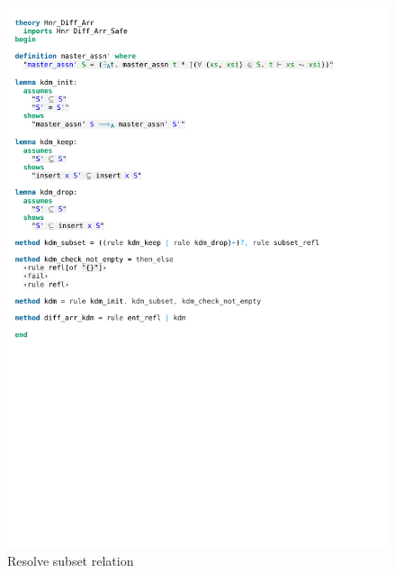 \begin{figure}[htpb]
    \includegraphics[trim={0 16,6cm 0 12,6cm}, clip, width=1.00\textwidth]{figures/Theory_Hnr_Diff_Arr_KDM.pdf}
    \caption[Resolve subset relation]{Resolve subset relation}
    \label{fig:kdm_subset}
\end{figure}

